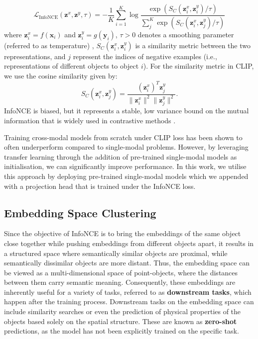 \documentclass[a4paper,12pt]{article}
\begin{document}
\begin{equation}
    \mathcal{L}_{\text{InfoNCE}}(\mathbf{z}^x, \mathbf{z}^y, \tau) = -\frac{1}{K} \sum_{i=1}^{K} \log \frac{\exp\left(S_C(\mathbf{z}^x_i, \mathbf{z}^y_i)/\tau\right)}{\sum_{j}^{K} \exp\left(S_C(\mathbf{z}^x_i, \mathbf{z}^y_j)/\tau\right)}
    \label{eq:infonce}
\end{equation}
where $\mathbf{z}^x_i=f(\mathbf{x}_i)$ and $\mathbf{z}^y_i=g(\mathbf{y}_i)$, $\tau > 0$ denotes a smoothing parameter (referred to as temperature) , $S_C(\mathbf{z}^x_i, \mathbf{z}^y_i)$ is a similarity metric between the two representations, and $j$ represent the indices of negative examples (i.e., representations of different objects to object $i$). For the similarity metric in CLIP, we use the cosine similarity given by:
\begin{equation}
    S_C(\mathbf{z}^x_i, \mathbf{z}^y_j) = \frac{(\mathbf{z}^x_i)^T \mathbf{z}^y_j}{\|\mathbf{z}^x_i\|^2 \|\mathbf{z}^y_j\|^2}.
    \label{eq:cosine}
\end{equation}
InfoNCE is biased, but it represents a stable, low variance bound on the mutual information that is widely used in contrastive methods \cite{crossCLIP}. 

Training cross-modal models from scratch under CLIP loss has been shown to often underperform compared to single-modal problems. However, by leveraging transfer learning through the addition of pre-trained single-modal models as initialisation, we can significantly improve performance. In this work, we utilise this approach by deploying pre-trained single-modal models which we appended with a projection head that is trained under the InfoNCE loss. 


\subsection{Embedding Space Clustering}
\label{sec:downstream}
Since the objective of InfoNCE is to bring the embeddings of the same object close together while pushing embeddings from different objects apart, it results in a structured space where semantically similar objects are proximal, while semantically dissimilar objects are more distant. Thus, the embedding space can be viewed as a multi-dimensional space of point-objects, where the distances between them carry semantic meaning. Consequently, these embeddings are inherently useful for a variety of tasks, referred to as \textbf{downstream tasks}, which happen after the training process. Downstream tasks on the embedding space can include similarity searches or even the prediction of physical properties of the objects based solely on the spatial structure. These are known as \textbf{zero-shot} predictions, as the model has not been explicitly trained on the specific task.
 
\end{document}
